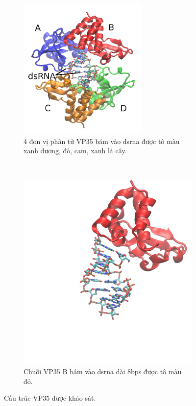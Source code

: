 \documentclass[12pt,a4paper,reqno, oneside]{book}
\begin{document}
		\begin{figure}[t!]
		\centering
		\begin{subfigure}{0.5\textheight}
		\centering
		\includegraphics[width=0.7\textwidth,natwidth=610,natheight=642]{VP35.png}
		\caption{4 đơn vị phân tử VP35 bám vào \gls{dsrna} được tô màu xanh dương, đỏ, cam, xanh lá cây.}
		\label{fig:vp35}
		\end{subfigure}\\
		\begin{subfigure}{0.5\textheight}
		\includegraphics[width=0.9\linewidth,natwidth=610,natheight=642]{VP35_B.png}
		\vspace{-50pt}
		\caption{Chuỗi VP35 B bám vào \gls{dsrna} dài 8bps được tô màu đỏ.}
		\label{fig:vp35b}
		\end{subfigure}
		\caption{Cấu trúc VP35 được khảo sát.}
		\label{fig:3l25}
		\end{figure}
\end{document}
